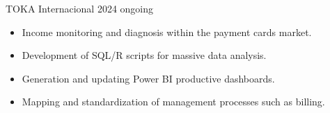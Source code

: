\documentclass{simplecv}
\begin{document}


    {TOKA Internacional}
    {}
    {2024}
    {ongoing}
    {
     \vspace{-11pt}
     \begin{itemize}[leftmargin=*]
     \setlength{\itemsep}{0cm}
         \item Income monitoring and diagnosis within the payment cards market.
         \item Development of SQL/R scripts for massive data analysis.
         \item Generation and updating Power BI productive dashboards.
         \item Mapping and standardization of management processes such as billing.
     \end{itemize}
    }
\end{document}
